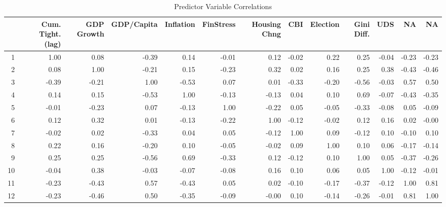 \begin{table}[ht]
\centering
\caption{Predictor Variable Correlations} 
\begingroup\tiny
\begin{tabular}{rrrrrrrrrrrrr}
  \hline
 & Cum. Tight. (lag) & GDP Growth & GDP/Capita & Inflation & FinStress & Housing Chng & CBI & Election & Gini Diff. & UDS & NA & NA \\ 
  \hline
1 & 1.00 & 0.08 & -0.39 & 0.14 & -0.01 & 0.12 & -0.02 & 0.22 & 0.25 & -0.04 & -0.23 & -0.23 \\ 
  2 & 0.08 & 1.00 & -0.21 & 0.15 & -0.23 & 0.32 & 0.02 & 0.16 & 0.25 & 0.38 & -0.43 & -0.46 \\ 
  3 & -0.39 & -0.21 & 1.00 & -0.53 & 0.07 & 0.01 & -0.33 & -0.20 & -0.56 & -0.03 & 0.57 & 0.50 \\ 
  4 & 0.14 & 0.15 & -0.53 & 1.00 & -0.13 & -0.13 & 0.04 & 0.10 & 0.69 & -0.07 & -0.43 & -0.35 \\ 
  5 & -0.01 & -0.23 & 0.07 & -0.13 & 1.00 & -0.22 & 0.05 & -0.05 & -0.33 & -0.08 & 0.05 & -0.09 \\ 
  6 & 0.12 & 0.32 & 0.01 & -0.13 & -0.22 & 1.00 & -0.12 & -0.02 & 0.12 & 0.16 & 0.02 & -0.00 \\ 
  7 & -0.02 & 0.02 & -0.33 & 0.04 & 0.05 & -0.12 & 1.00 & 0.09 & -0.12 & 0.10 & -0.10 & 0.10 \\ 
  8 & 0.22 & 0.16 & -0.20 & 0.10 & -0.05 & -0.02 & 0.09 & 1.00 & 0.10 & 0.06 & -0.17 & -0.14 \\ 
  9 & 0.25 & 0.25 & -0.56 & 0.69 & -0.33 & 0.12 & -0.12 & 0.10 & 1.00 & 0.05 & -0.37 & -0.26 \\ 
  10 & -0.04 & 0.38 & -0.03 & -0.07 & -0.08 & 0.16 & 0.10 & 0.06 & 0.05 & 1.00 & -0.12 & -0.01 \\ 
  11 & -0.23 & -0.43 & 0.57 & -0.43 & 0.05 & 0.02 & -0.10 & -0.17 & -0.37 & -0.12 & 1.00 & 0.81 \\ 
  12 & -0.23 & -0.46 & 0.50 & -0.35 & -0.09 & -0.00 & 0.10 & -0.14 & -0.26 & -0.01 & 0.81 & 1.00 \\ 
   \hline
\end{tabular}
\endgroup
\end{table}
